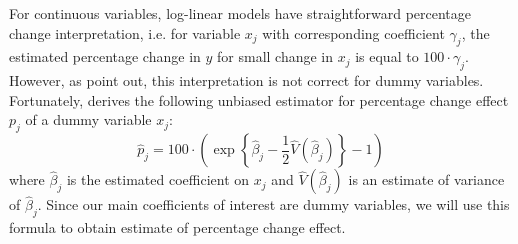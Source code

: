 For continuous variables, log-linear models have straightforward percentage change interpretation, i.e. for variable $x_j$ with corresponding coefficient $\gamma_j$, the estimated percentage change in $y$ for small change in $x_j$ is equal to $100 \cdot \gamma_j$. However, as \citet{halvorsen_interpretation_1980} point out, this interpretation is not correct for dummy variables. Fortunately, \citet{kennedy_estimation_1981} derives the following unbiased estimator for percentage change effect $p_j$ of a dummy variable $x_j$:
\begin{equation}
\hat p_j = 100 \cdot \left(\exp\left\{\hat\beta_j - \frac{1}{2} \hat V\left(\hat\beta_j\right)\right\} - 1 \right)
 \label{eq:dummy_vars}
\end{equation}
where $\hat\beta_j$ is the estimated coefficient on $x_j$ and  $\hat V\left(\hat\beta_j\right)$ is an estimate of variance of $\hat\beta_j$. 
Since our main coefficients of interest are dummy variables, we will use this formula to obtain estimate of percentage change effect.






